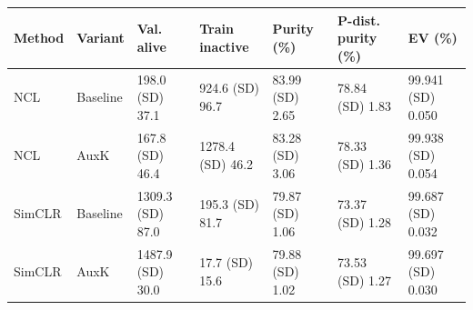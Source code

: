 \begin{tabular}{lllllll}
\toprule
Method & Variant & Val. alive & Train inactive & Purity (\%) & P-dist. purity (\%) & EV (\%) \\
\midrule
NCL & Baseline & 198.0 (SD) 37.1 & 924.6 (SD) 96.7 & 83.99 (SD) 2.65 & 78.84 (SD) 1.83 & 99.941 (SD) 0.050 \\
NCL & AuxK & 167.8 (SD) 46.4 & 1278.4 (SD) 46.2 & 83.28 (SD) 3.06 & 78.33 (SD) 1.36 & 99.938 (SD) 0.054 \\
SimCLR & Baseline & 1309.3 (SD) 87.0 & 195.3 (SD) 81.7 & 79.87 (SD) 1.06 & 73.37 (SD) 1.28 & 99.687 (SD) 0.032 \\
SimCLR & AuxK & 1487.9 (SD) 30.0 & 17.7 (SD) 15.6 & 79.88 (SD) 1.02 & 73.53 (SD) 1.27 & 99.697 (SD) 0.030 \\
\bottomrule
\end{tabular}
